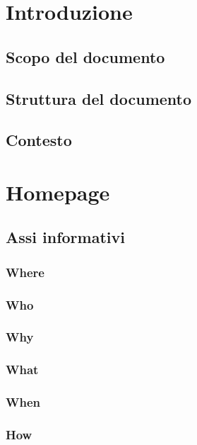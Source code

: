 \documentclass[a4paper, oneside, openany, dvipsnames, table]{article}
\begin{document}
\copertina
\hypersetup{linkcolor=black}
\tableofcontents

\hypersetup{linkcolor=blue}
\newpage

\section{Introduzione}
	\subsection{Scopo del documento}
		
	\subsection{Struttura del documento}
		
	\subsection{Contesto}
		


\newpage
\section{Homepage}
	\label{sez:Home}
	\subsection{Assi informativi}
		\subsubsection{Where}
			
		\subsubsection{Who}
			
		\subsubsection{Why}
			
		\subsubsection{What}
			
		\subsubsection{When}
			
		\subsubsection{How}
			
\end{document}
